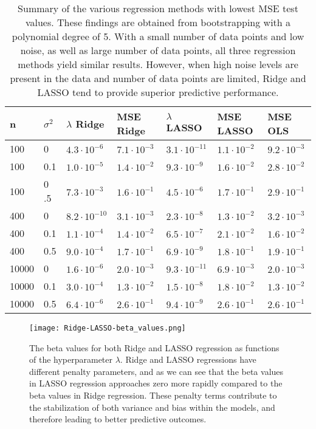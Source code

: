 \documentclass[a4paper,12pt]{article}
\begin{document}
\begin{table}[H]
\caption{Summary of the various regression methods with lowest MSE test values. These findings are obtained from bootstrapping with a polynomial degree of 5. With a small number of data points and low noise, as well as large number of data points, all three regression methods yield similar results. However, when high noise levels are present in the data and number of data points are limited, Ridge and LASSO tend to provide superior predictive performance. } 
\centering 
\begin{tabular}{l l l l l l l} 
\hline\hline 
 n & $\sigma^2$ & $\lambda$ Ridge &MSE Ridge &  $\lambda$ LASSO & MSE LASSO &MSE OLS       \\ [0.5ex] 
\hline 
100    & 0    &$4.3\cdot 10^{-6}$&$7.1\cdot 10^{-3}$ &$3.1\cdot 10^{-11}$ &$1.1\cdot 10^{-2}$&$9.2\cdot 10^{-3}  $ \\
100    & 0.1 &$1.0\cdot 10^{-5} $&$1.4\cdot 10^{-2}$ &$9.3\cdot 10^{-9}$ &$1.6\cdot 10^{-2} $&$2.8\cdot 10^{-2}$ \\
100    & 0 .5&$7.3\cdot 10^{-3}$&$1.6\cdot 10^{-1} $ &$4.5\cdot 10^{-6} $ &$1.7\cdot 10^{-1}$&$2.9\cdot 10^{-1} $ \\ 
400    & 0    &$8.2\cdot 10^{-10}$&$3.1\cdot 10^{-3} $ &$2.3\cdot 10^{-8} $ &$1.3\cdot 10^{-2}$&$3.2\cdot 10^{-3} $ \\
400    & 0.1 &$1.1\cdot 10^{-4}$&$1.4\cdot 10^{-2} $  &$6.5\cdot 10^{-7} $&$2.1\cdot 10^{-2} $&$1.6\cdot 10^{-2} $ \\
400    & 0.5 &$9.0\cdot 10^{-4} $&$1.7\cdot 10^{-1} $ &$6.9\cdot 10^{-9} $ &$1.8\cdot 10^{-1} $&$1.9\cdot 10^{-1}$ \\ 
10000& 0    &$1.6\cdot 10^{-6}$ &$2.0\cdot 10^{-3}$ &$9.3\cdot 10^{-11}$ &$6.9\cdot 10^{-3} $&$2.0\cdot 10^{-3} $ \\
10000& 0.1 &$3.0\cdot 10^{-4} $&$1.3\cdot 10^{-2} $ &$1.5\cdot 10^{-8} $ &$1.8\cdot 10^{-2}$&$1.3\cdot 10^{-2} $ \\
10000& 0.5 &$6.4\cdot 10^{-6}$&$2.6\cdot 10^{-1} $&$9.4\cdot 10^{-9} $&$2.6\cdot 10^{-1} $&$2.6\cdot 10^{-1} $ \\ [1ex] 
\hline\hline
\end{tabular}
\end{table}








\begin{figure}[H]
\centerline{\texttt{[image: Ridge-LASSO-beta\_values.png]}}
\caption{The beta values for both Ridge and LASSO regression as functions of the hyperparameter $\lambda$. Ridge and LASSO regressions have different penalty parameters, and as we can see that the beta values in LASSO regression approaches zero more rapidly compared to the beta values in Ridge regression. These penalty terms contribute to the stabilization of both variance and bias within the models, and therefore leading to better predictive outcomes.}
\label{fig}
\end{figure}
\end{document}
